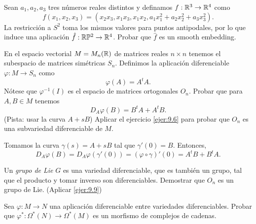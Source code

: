 \documentclass[twoside]{article}
\begin{document}
\begin{ejercicio}{9.8}
Sean $a_1,a_2,a_3$ tres números reales distintos y definamos $f:\mathbb{R}^3\to\mathbb{R}^4$ como
\[
f(x_1,x_2,x_3)=(x_2x_3,x_1x_3,x_1x_2,a_1x_1^2+a_2x_2^2+a_3x_3^2).
\]
La restricción a $S^2$ toma los mismos valores para puntos antipodales, por lo que induce una aplicación $\hat{f}:\mathbb{R}\mathbb{P}^2\to\mathbb{R}^4$. Probar que $\hat{f}$ es un smooth embedding.
\end{ejercicio}
\begin{solucion}
\end{solucion}

\newpage

\begin{ejercicio}{9.9}
En el espacio vectorial $M=M_n(\mathbb{R})$ de matrices reales $n\times n$ tenemos el subespacio de matrices simétricas $S_n$. Definimos la aplicación diferenciable $\varphi:M\to S_n$ como 
\[
\varphi(A)=A^tA.
\]
Nótese que $\varphi^{-1}(I)$ es el espacio de matrices ortogonales $O_n$. Probar que para $A,B\in M$ tenemos
\[
D_A\varphi(B)=B^tA+A^tB.
\]
(Pista: usar la curva $A+sB$)
Aplicar el ejercicio \ref{ejer:9.6} para probar que $O_n$ es una subvariedad diferenciable de $M$.
\end{ejercicio}
\begin{solucion}
Tomamos la curva $\gamma(s)=A+sB$ tal que $\gamma'(0)=B$. Entonces, 
\[
D_A\varphi(B)=D_A\varphi(\gamma'(0))=(\varphi\circ\gamma)'(0)=A^tB+B^tA.
\]
\end{solucion}
\newpage

\begin{ejercicio}{9.10}
Un \emph{grupo de Lie} $G$ es una variedad diferenciable, que es también un grupo, tal que el producto y tomar inverso son diferenciables. Demostrar que $O_n$ es un grupo de Lie. (Aplicar \ref{ejer:9.9})
\end{ejercicio}
\begin{solucion}
\end{solucion}
\newpage

\begin{ejercicio}{9.6}
Sea $\varphi:M\to N$ una aplicación diferenciable entre variedades diferenciables. Probar que $\varphi^*:\Omega^*(N)\to\Omega^*(M)$ es un morfismo de complejos de cadenas.
\end{ejercicio}
\begin{solucion}
\end{solucion}
\end{document}
